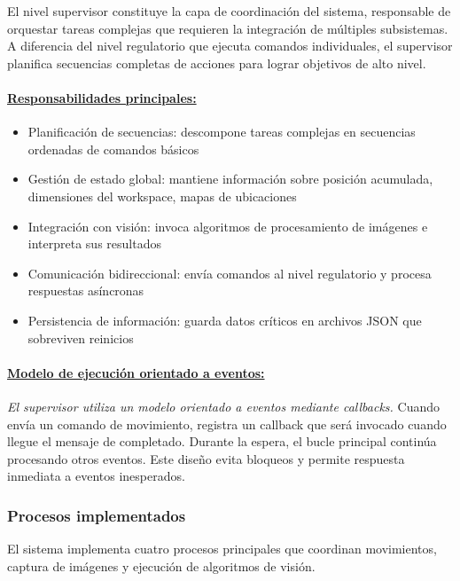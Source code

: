 El nivel supervisor constituye la capa de coordinación del sistema, responsable de orquestar tareas complejas que requieren la integración de múltiples subsistemas. A diferencia del nivel regulatorio que ejecuta comandos individuales, el supervisor planifica secuencias completas de acciones para lograr objetivos de alto nivel.

\paragraph{\underline{Responsabilidades principales:}}

\begin{itemize}[label=$\bullet$]
    \item Planificación de secuencias: descompone tareas complejas en secuencias ordenadas de comandos básicos
    \item Gestión de estado global: mantiene información sobre posición acumulada, dimensiones del workspace, mapas de ubicaciones
    \item Integración con visión: invoca algoritmos de procesamiento de imágenes e interpreta sus resultados
    \item Comunicación bidireccional: envía comandos al nivel regulatorio y procesa respuestas asíncronas
    \item Persistencia de información: guarda datos críticos en archivos JSON que sobreviven reinicios
\end{itemize}

\paragraph{\underline{Modelo de ejecución orientado a eventos:}}

\textit{El supervisor utiliza un modelo orientado a eventos mediante callbacks.} Cuando envía un comando de movimiento, registra un callback que será invocado cuando llegue el mensaje de completado. Durante la espera, el bucle principal continúa procesando otros eventos. Este diseño evita bloqueos y permite respuesta inmediata a eventos inesperados.

\subsubsection{Procesos implementados}

El sistema implementa cuatro procesos principales que coordinan movimientos, captura de imágenes y ejecución de algoritmos de visión.


